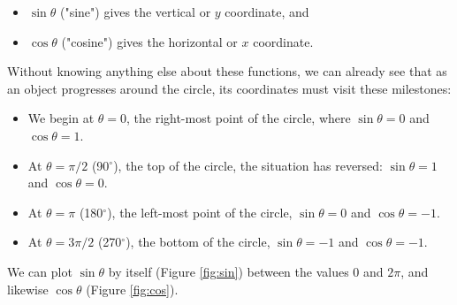 \begin{itemize}
    \item $\sin \theta$ ("sine") gives the vertical or $y$ coordinate, and
    \item $\cos \theta$ ("cosine") gives the horizontal or $x$ coordinate.
\end{itemize}

Without knowing anything else about these functions, we can already see that as an object progresses around the circle, its coordinates must visit these milestones:

\begin{itemize}
    \item We begin at $\theta = 0$, the right-most point of the circle, where $\sin \theta = 0$ and $\cos \theta = 1$.
    \item At $\theta = \pi/2$ (90$^\circ$), the top of the circle, the situation has reversed: $\sin \theta = 1$ and $\cos \theta = 0$.
    \item At $\theta = \pi$ (180$^\circ$), the left-most point of the circle, $\sin \theta = 0$ and $\cos \theta = -1$.
    \item At $\theta = 3\pi/2$ (270$^\circ$), the bottom of the circle, $\sin \theta = -1$ and $\cos \theta = -1$.
\end{itemize}

We can plot $\sin \theta$ by itself (Figure \ref{fig:sin}) between the values $0$ and $2\pi$, and likewise $\cos \theta$ (Figure \ref{fig:cos}).

